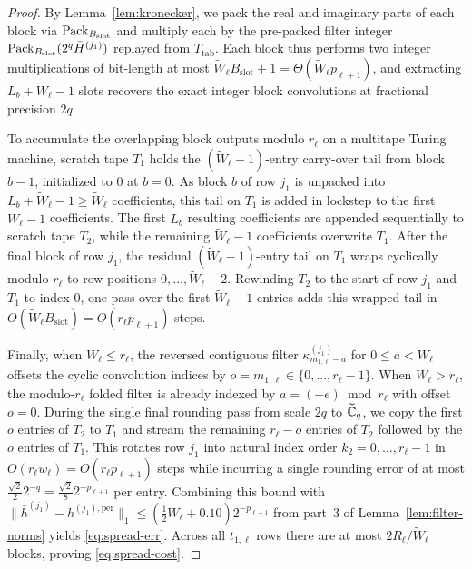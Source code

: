 \begin{proof}
By Lemma~\ref{lem:kronecker}, we pack the real and imaginary parts of each block via $\operatorname{Pack}_{B_{\mathrm{slot}}}$ and multiply each by the pre-packed filter integer $\operatorname{Pack}_{B_{\mathrm{slot}}}(2^q \bar{H}^{(j_1)})$ replayed from $T_{\mathrm{tab}}$. Each block thus performs two integer multiplications of bit-length at most $\tilde{W}_\ell B_{\mathrm{slot}} + 1 = \Theta(\tilde{W}_\ell p_{\ell+1})$, and extracting $L_b + \tilde{W}_\ell - 1$ slots recovers the exact integer block convolutions at fractional precision $2q$.

To accumulate the overlapping block outputs modulo $r_\ell$ on a multitape Turing machine, scratch tape $T_1$ holds the $(\tilde{W}_\ell - 1)$-entry carry-over tail from block $b - 1$, initialized to $0$ at $b = 0$. As block $b$ of row $j_1$ is unpacked into $L_b + \tilde{W}_\ell - 1 \ge \tilde{W}_\ell$ coefficients, this tail on $T_1$ is added in lockstep to the first $\tilde{W}_\ell - 1$ coefficients. The first $L_b$ resulting coefficients are appended sequentially to scratch tape $T_2$, while the remaining $\tilde{W}_\ell - 1$ coefficients overwrite $T_1$. After the final block of row $j_1$, the residual $(\tilde{W}_\ell - 1)$-entry tail on $T_1$ wraps cyclically modulo $r_\ell$ to row positions $0, \dots, \tilde{W}_\ell - 2$. Rewinding $T_2$ to the start of row $j_1$ and $T_1$ to index $0$, one pass over the first $\tilde{W}_\ell - 1$ entries adds this wrapped tail in $O(\tilde{W}_\ell B_{\mathrm{slot}}) = O(r_\ell p_{\ell+1})$ steps.

Finally, when $W_\ell \le r_\ell$, the reversed contiguous filter $\kappa^{(j_1)}_{m_{1,\ell} - a}$ for $0 \le a < W_\ell$ offsets the cyclic convolution indices by $o = m_{1,\ell} \in \{0, \dots, r_\ell - 1\}$. When $W_\ell > r_\ell$, the modulo-$r_\ell$ folded filter is already indexed by $a = (-e) \bmod r_\ell$ with offset $o = 0$. During the single final rounding pass from scale $2q$ to $\widetilde{\mathbb{C}}_q$, we copy the first $o$ entries of $T_2$ to $T_1$ and stream the remaining $r_\ell - o$ entries of $T_2$ followed by the $o$ entries of $T_1$. This rotates row $j_1$ into natural index order $k_2 = 0, \dots, r_\ell - 1$ in $O(r_\ell w_\ell) = O(r_\ell p_{\ell+1})$ steps while incurring a single rounding error of at most $\frac{\sqrt{2}}{2} 2^{-q} = \frac{\sqrt{2}}{8} 2^{-p_{\ell+1}}$ per entry. Combining this bound with $\|\bar{h}^{(j_1)} - h^{(j_1),\mathrm{per}}\|_1 \le (\frac{1}{2}\tilde{W}_\ell + 0.10) 2^{-p_{\ell+1}}$ from part~3 of Lemma~\ref{lem:filter-norms} yields \eqref{eq:spread-err}. Across all $t_{1,\ell}$ rows there are at most $2 R_\ell / \tilde{W}_\ell$ blocks, proving \eqref{eq:spread-cost}.
\end{proof}

